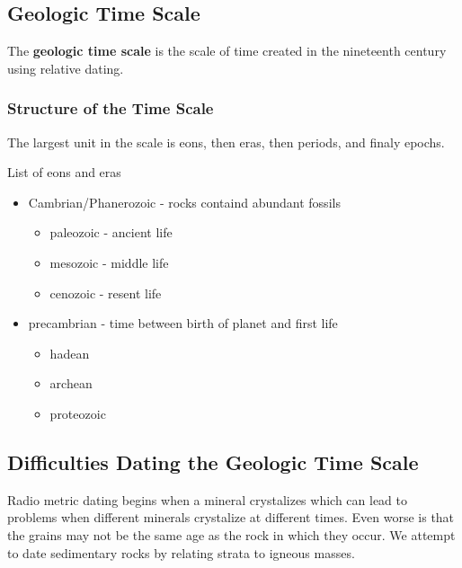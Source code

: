 \documentclass{article}
\begin{document}
\subsection{Geologic Time Scale} %
\label{sub:geologic_time_scale}
The \textbf{geologic time scale} is the scale of time created in the nineteenth century using relative dating.

\subsubsection{Structure of the Time Scale} %
\label{sub:structure_of_the_time_scale}
The largest unit in the scale is eons, then eras, then periods, and finaly epochs.

List of eons and eras
\begin{itemize}
    \item Cambrian/Phanerozoic - rocks containd abundant fossils
    \begin{itemize}
        \item paleozoic - ancient life
        \item mesozoic - middle life
        \item cenozoic - resent life
    \end{itemize}
    \item precambrian - time between birth of planet and first life
    \begin{itemize}
        \item hadean
        \item archean
        \item proteozoic
    \end{itemize}
\end{itemize}

\subsection{Difficulties Dating the Geologic Time Scale} %
\label{sub:difficulties_dating_the_geologic_time_scale}
Radio metric dating begins when a mineral crystalizes which can lead to problems when different minerals crystalize at different times. Even worse is that the grains may not be the same age as the rock in which they occur. We attempt to date sedimentary rocks by relating strata to igneous masses.








\end{document}
